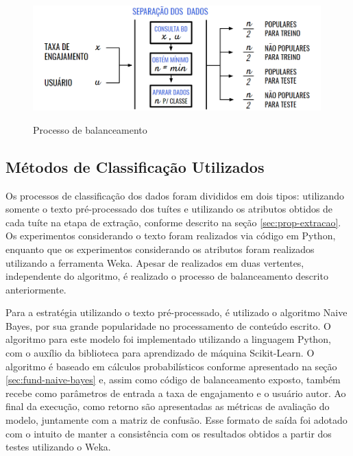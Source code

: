 \documentclass[oneside,openright,12pt]{ufsm_2015} %
\begin{document}
    \begin{figure}[H]
        \caption{Processo de balanceamento}
        \centering
        \includegraphics[width=0.99\textwidth]{figuras/balanceamento.png}
        \vspace{\baselineskip} %
        \label{fig:balanceamento}
    \end{figure}


\subsection{Métodos de Classificação Utilizados}
\label{sec:prop-class-metodos}

    \par Os processos de classificação dos dados foram divididos em dois tipos: utilizando somente o texto pré-processado dos tuítes e utilizando os atributos obtidos de cada tuíte na etapa de extração, conforme descrito na seção \ref{sec:prop-extracao}. Os experimentos considerando o texto foram realizados via código em Python, enquanto que os experimentos considerando os atributos foram realizados utilizando a ferramenta Weka. Apesar de realizados em duas vertentes, independente do algoritmo, é realizado o processo de balanceamento descrito anteriormente.
    
    \par Para a estratégia utilizando o texto pré-processado, é utilizado o algoritmo Naive Bayes, por sua grande popularidade no processamento de conteúdo escrito. O algoritmo para este modelo foi implementado utilizando a linguagem Python, com o auxílio da biblioteca para aprendizado de máquina Scikit-Learn. O algoritmo é baseado em cálculos probabilísticos conforme apresentado na seção \ref{sec:fund-naive-bayes} e, assim como código de balanceamento exposto, também recebe como parâmetros de entrada a taxa de engajamento e o usuário autor. Ao final da execução, como retorno são apresentadas as métricas de avaliação do modelo, juntamente com a matriz de confusão. Esse formato de saída foi adotado com o intuito de manter a consistência com os resultados obtidos a partir dos testes utilizando o Weka.
    
\end{document}

